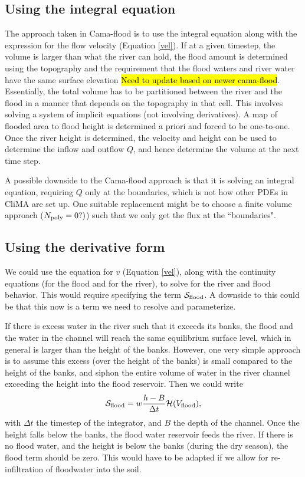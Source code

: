 \documentclass[twoside,10pt]{report}
\begin{document}
\subsection{Using the integral equation}
The approach taken in Cama-flood is to use the integral equation along with the expression for the flow velocity (Equation \eqref{vel}). If at a given timestep, the volume is larger than what the river can hold, the flood amount is determined using the topography and the requirement that the flood waters and river water have the same surface elevation \hl{Need to update based on newer cama-flood}. Essentially, the total volume has to be partitioned between the river and the flood in a manner that depends on the topography in that cell. This involves solving a system of implicit equations (not involving derivatives). A map of flooded area to flood height is determined a priori and forced to be one-to-one. Once the river height is determined, the velocity and height can be used to determine the inflow and outflow $Q$, and hence determine the volume at the next time step.

A possible downside to the Cama-flood approach is that it is solving an integral equation, requiring $Q$ only at the boundaries, which is not how other PDEs in CliMA are set up. One suitable replacement might be to choose a finite volume approach ($N_{\rm poly} = 0?)$) such that we only get the flux at the ``boundaries".

\subsection{Using the derivative form}
We could use the equation for $v$ (Equation \eqref{vel}), along with the continuity equations (for the flood and for the river), to solve for the river and flood behavior. This would require specifying the term $\mathcal{S}_{\rm flood}$. A downside to this could be that this now is a term we need to resolve and parameterize.

If there is excess water in the river such that it exceeds its banks, the flood and the water in the channel will reach the same equilibrium surface level, which in general is larger than the height of the banks. However, one very simple approach is to assume this excess (over the height of the banks) is small compared to the height of the banks, and siphon the entire volume of water in the river channel exceeding the height into the flood reservoir. Then we could write 
\begin{equation}
    \mathcal{S}_{\rm flood} = w\frac{h-B}{\Delta t}\mathcal{H}(V_{\rm flood}),
\end{equation}
with $\Delta t$ the timestep of the integrator, and $B$ the depth of the channel. Once the height falls below the banks, the flood water reservoir feeds the river. If there is no flood water, and the height is below the banks (during the dry season), the flood term should be zero.  This would have to be adapted if we allow for re-infiltration of floodwater into the soil. 
\end{document}
